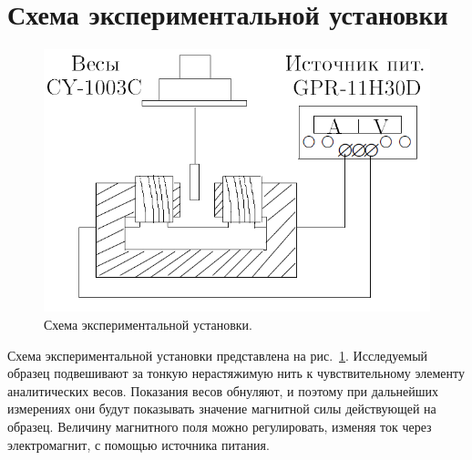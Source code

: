 \section*{Схема экспериментальной установки}

\begin{figure}
	\includegraphics[width=\linewidth]{../res/scheme.png}
	\caption{Схема экспериментальной установки.}
	\label{img:scheme}
\end{figure}

Схема экспериментальной установки представлена на рис.~\ref{img:scheme}. Исследуемый образец подвешивают за тонкую нерастяжимую нить к чувствительному элементу аналитических весов. Показания весов обнуляют, и поэтому при дальнейших измерениях они будут показывать значение магнитной силы действующей на образец. Величину магнитного поля можно регулировать, изменяя ток через электромагнит, с помощью источника питания.